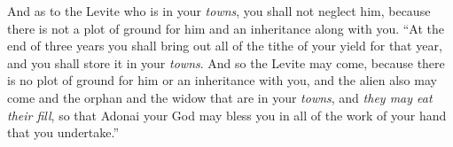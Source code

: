 \begin{biblechapter}
\verse And as to the Levite who is in your \textit{towns}, you shall not neglect him, because there is not a plot of ground for him and an inheritance along with you.
\verse “At the end of three years you shall bring out all of the tithe of your yield for that year, and you shall store it in your \textit{towns}.
\verse And so the Levite may come, because there is no plot of ground for him or an inheritance with you, and the alien also may come and the orphan and the widow that are in your \textit{towns}, and \textit{they may eat their fill}, so that Adonai your God may bless you in all of the work of your hand that you undertake.”
\end{biblechapter}

